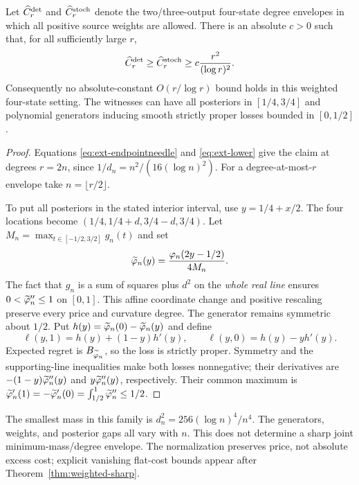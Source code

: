 \begin{theorem}
\label{thm:ext-weightdegenerate}
Let $\widehat C_r^{\mathrm{det}}$ and $\widehat C_r^{\mathrm{stoch}}$ denote the two/three-output
four-state degree envelopes in which all positive source weights are allowed.
There is an absolute $c>0$ such that, for all sufficiently large $r$,
\[
 \widehat C_r^{\mathrm{det}}\ge\widehat C_r^{\mathrm{stoch}}
 \ge c\frac{r^2}{(\log r)^2}.
\]
Consequently no absolute-constant $O(r/\log r)$ bound holds in this weighted
four-state setting. The witnesses can have all posteriors in $[1/4,3/4]$
and polynomial generators inducing smooth strictly proper losses bounded
in $[0,1/2]$.
\end{theorem}
\begin{proof}
Equations \eqref{eq:ext-endpointneedle} and \eqref{eq:ext-lower} give the
claim at degrees $r=2n$, since $1/d_n=n^2/(16(\log n)^2)$.
For a degree-at-most-$r$ envelope take $n=\lfloor r/2\rfloor$.

To put all posteriors in the stated interior interval, use
$y=1/4+x/2$. The four locations become
$(1/4,1/4+d,3/4-d,3/4)$.
Let $M_n=\max_{t\in[-1/2,3/2]}g_n(t)$ and set
\[
 \widetilde{\varphi}_n(y)=\frac{\varphi_n(2y-1/2)}{4M_n}.
\]
The fact that $g_n$ is a sum of squares plus $d^2$ on the \emph{whole real
line} ensures $0<\widetilde{\varphi}_n''\le1$ on $[0,1]$. This affine coordinate
change and positive rescaling preserve every price and curvature degree.
The generator remains symmetric about $1/2$. Put
$h(y)=\widetilde{\varphi}_n(0)-\widetilde{\varphi}_n(y)$ and define
\[
 \ell(y,1)=h(y)+(1-y)h'(y),\qquad
 \ell(y,0)=h(y)-yh'(y).
\]
Expected regret is $B_{\widetilde{\varphi}_n}$, so the loss is strictly proper.
Symmetry and the supporting-line inequalities make both losses nonnegative;
their derivatives are $-(1-y)\widetilde{\varphi}_n''(y)$ and
$y\widetilde{\varphi}_n''(y)$, respectively. Their common maximum is
$\widetilde{\varphi}_n'(1)=-\widetilde{\varphi}_n'(0)
=\int_{1/2}^1\widetilde{\varphi}_n''\le1/2$.
\end{proof}


The smallest mass in this family is $d_n^2=256(\log n)^4/n^4$.
The generators, weights, and posterior gaps all vary with $n$. This does
not determine a sharp joint minimum-mass/degree envelope. The normalization
preserves price, not absolute excess cost; explicit vanishing flat-cost
bounds appear after Theorem~\ref{thm:weighted-sharp}.
